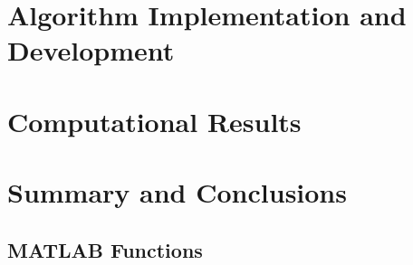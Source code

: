 \documentclass{article}
\begin{document}
\section{Algorithm Implementation and Development}


\section{Computational Results}
    

\section{Summary and Conclusions}
   
\printbibliography

\begin{appendices}

\section{MATLAB Functions}

    
\end{appendices}
\end{document}
